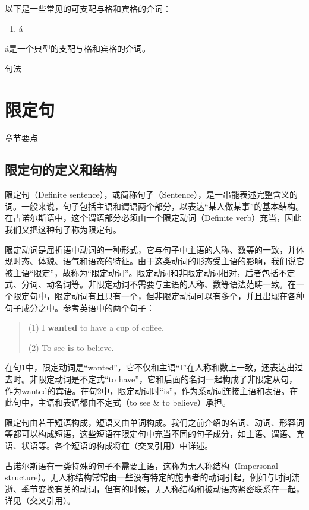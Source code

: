 以下是一些常见的可支配与格和宾格的介词：

\begin{enumerate}
\def\labelenumi{\arabic{enumi}.}
\item
  á
\end{enumerate}

á是一个典型的支配与格和宾格的介词。

句法

\section{限定句}\label{ux9650ux5b9aux53e5}

章节要点

\subsection{限定句的定义和结构}\label{ux9650ux5b9aux53e5ux7684ux5b9aux4e49ux548cux7ed3ux6784}

限定句（Definite
sentence），或简称句子（Sentence），是一串能表述完整含义的词。一般来说，句子包括主语和谓语两个部分，以表达``某人做某事''的基本结构。在古诺尔斯语中，这个谓语部分必须由一个限定动词（Definite
verb）充当，因此我们又把这种句子称为限定句。

限定动词是屈折语中动词的一种形式，它与句子中主语的人称、数等的一致，并体现时态、体貌、语气和语态的特征。由于这类动词的形态受主语的影响，我们说它被主语``限定''，故称为``限定动词''。限定动词和非限定动词相对，后者包括不定式、分词、动名词等。非限定动词不需要与主语的人称、数等语法范畴一致。在一个限定句中，限定动词有且只有一个，但非限定动词可以有多个，并且出现在各种句子成分之中。参考英语中的两个句子：

\begin{quote}
(1) I \textbf{wanted} to have a cup of coffee.

(2) To see \textbf{is} to believe.
\end{quote}

在句1中，限定动词是``wanted''，它不仅和主语``I''在人称和数上一致，还表达出过去时。非限定动词是不定式``to
have''，它和后面的名词一起构成了非限定从句，作为wanted的宾语。在句2中，限定动词时``is''，作为系动词连接主语和表语。在此句中，主语和表语都由不定式（to
see \& to believe）承担。

限定句由若干短语构成，短语又由单词构成。我们之前介绍的名词、动词、形容词等都可以构成短语，这些短语在限定句中充当不同的句子成分，如主语、谓语、宾语、状语等。各个短语的构成将在（交叉引用）中详述。

古诺尔斯语有一类特殊的句子不需要主语，这称为无人称结构（Impersonal
structure）。无人称结构常常由一些没有特定的施事者的动词引起，例如与时间流逝、季节变换有关的动词，但有的时候，无人称结构和被动语态紧密联系在一起，详见（交叉引用）。

